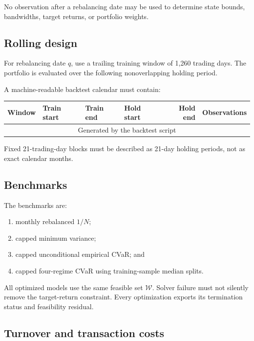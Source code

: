 \documentclass[11pt,a4paper]{article}
\theoremstyle{definition}
\theoremstyle{remark}
\newcommand{\W}{\mathcal{W}}
\begin{document}
No observation after a rebalancing date may be used to determine state bounds,
bandwidths, target returns, or portfolio weights.

\subsection{Rolling design}

For rebalancing date \(q\), use a trailing training window of 1,260 trading
days. The portfolio is evaluated over the following nonoverlapping holding
period.

A machine-readable backtest calendar must contain:

\begin{center}
\begin{tabular}{llllrr}
\toprule
Window & Train start & Train end & Hold start & Hold end & Observations\\
\midrule
\multicolumn{6}{c}{Generated by the backtest script}\\
\bottomrule
\end{tabular}
\end{center}

Fixed 21-trading-day blocks must be described as 21-day holding periods, not
as exact calendar months.

\subsection{Benchmarks}

The benchmarks are:

\begin{enumerate}
    \item monthly rebalanced \(1/N\);
    \item capped minimum variance;
    \item capped unconditional empirical CVaR; and
    \item capped four-regime CVaR using training-sample median splits.
\end{enumerate}

All optimized models use the same feasible set \(\W\). Solver failure must not
silently remove the target-return constraint. Every optimization exports its
termination status and feasibility residual.

\subsection{Turnover and transaction costs}
\end{document}
